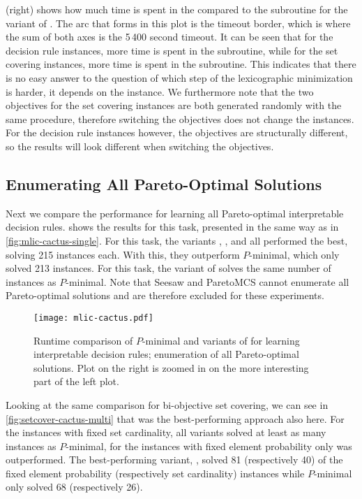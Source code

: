  (right) shows how much time is spent in the \Min{} compared to the \Simpr{} subroutine for the \msh{} variant of \algname{}.
The arc that forms in this plot is the timeout border, which is where the sum of both axes is the 5\,400 second timeout.
It can be seen that for the decision rule instances, more time is spent in the \Simpr{} subroutine, while for the set covering instances, more time is spent in the \Min{} subroutine.
This indicates that there is no easy answer to the question of which step of the lexicographic minimization is harder, it depends on the instance.
We furthermore note that the two objectives for the set covering instances are both generated randomly with the same procedure, therefore switching the objectives does not change the instances.
For the decision rule instances however, the objectives are structurally different, so the results will look different when switching the objectives.

\subsection{Enumerating All Pareto-Optimal Solutions}

Next we compare the performance for learning all Pareto-optimal interpretable decision rules.
 shows the results for this task, presented in the same way as in \cref{fig:mlic-cactus-single}.
For this task, the \algname{} variants \satunsat{}, \unsatsat{}, \msu{} and \msh{} all performed the best, solving 215 instances each.
With this, they outperform $P$-minimal, which only solved 213 instances.
For this task, the \oll{} variant of \algname{} solves the same number of instances as $P$-minimal.
Note that Seesaw and ParetoMCS cannot enumerate all Pareto-optimal solutions and are therefore excluded for these experiments.

\begin{figure}
  \centering
  \texttt{[image: mlic-cactus.pdf]}
  \caption{Runtime comparison of $P$-minimal and variants of \algname{} for learning interpretable decision rules;
    enumeration of all Pareto-optimal solutions.
    Plot on the right is zoomed in on the more interesting part of the left plot.
  }\label{fig:mlic-cactus-multi}
\end{figure}

Looking at the same comparison for bi-objective set covering, we can see in \cref{fig:setcover-cactus-multi} that \msh{} was the best-performing approach also here.
For the instances with fixed set cardinality, all \algname{} variants solved at least as many instances as $P$-minimal, for the instances with fixed element probability only \oll{} was outperformed.
The best-performing variant, \msh{}, solved 81 (respectively 40) of the fixed element probability (respectively set cardinality) instances while $P$-minimal only solved 68 (respectively 26).

